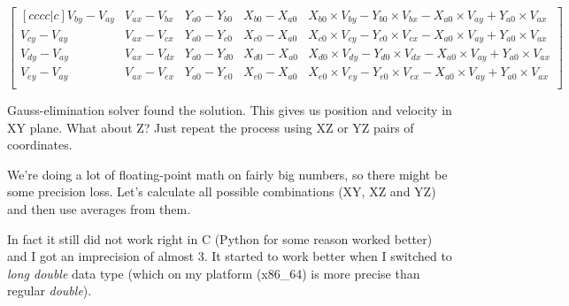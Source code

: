 \documentclass{article}
\begin{document}
\begin{displaymath}
    \begin{bmatrix}[cccc|c]
        V_{by} - V_{ay} & V_{ax} - V_{bx} & Y_{a0} - Y_{b0} & X_{b0} - X_{a0} & X_{b0} \times V_{by} - Y_{b0} \times V_{bx} - X_{a0} \times V_{ay} + Y_{a0} \times V_{ax}\\
        V_{cy} - V_{ay} & V_{ax} - V_{cx} & Y_{a0} - Y_{c0} & X_{c0} - X_{a0} & X_{c0} \times V_{cy} - Y_{c0} \times V_{cx} - X_{a0} \times V_{ay} + Y_{a0} \times V_{ax}\\
        V_{dy} - V_{ay} & V_{ax} - V_{dx} & Y_{a0} - Y_{d0} & X_{d0} - X_{a0} & X_{d0} \times V_{dy} - Y_{d0} \times V_{dx} - X_{a0} \times V_{ay} + Y_{a0} \times V_{ax}\\
        V_{ey} - V_{ay} & V_{ax} - V_{ex} & Y_{a0} - Y_{e0} & X_{e0} - X_{a0} & X_{e0} \times V_{ey} - Y_{e0} \times V_{ex} - X_{a0} \times V_{ay} + Y_{a0} \times V_{ax}\\
    \end{bmatrix}
\end{displaymath}

Gauss-elimination solver found the solution. This gives us position and velocity in XY plane. What about Z? Just repeat the process using XZ or YZ pairs of coordinates.

We're doing a lot of floating-point math on fairly big numbers, so there might be some precision loss. Let's calculate all possible combinations (XY, XZ and YZ)
and then use averages from them.

In fact it still did not work right in C (Python for some reason worked better) and I got an imprecision of almost 3. It started to work better when I switched
to \emph{long double} data type (which on my platform (x86\_64) is more precise than regular \emph{double}).
\end{document}

